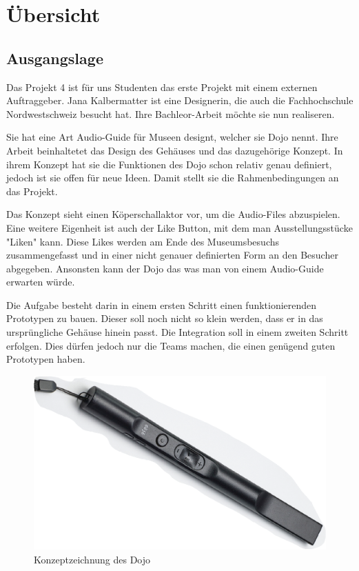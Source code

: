 \section{Übersicht} 

\subsection{Ausgangslage}
Das Projekt 4 ist für uns Studenten das erste Projekt mit einem externen Auftraggeber. Jana Kalbermatter ist eine Designerin, die auch die Fachhochschule Nordwestschweiz besucht hat. Ihre Bachleor-Arbeit möchte sie nun realiseren.

Sie hat eine Art Audio-Guide für Museen designt, welcher sie Dojo nennt. Ihre Arbeit beinhaltetet das Design des Gehäuses und das dazugehörige Konzept. In ihrem Konzept hat sie die Funktionen des Dojo schon relativ genau definiert, jedoch ist sie offen für neue Ideen. Damit stellt sie die Rahmenbedingungen an das Projekt.

Das Konzept sieht einen Köperschallaktor vor, um die Audio-Files abzuspielen. Eine weitere Eigenheit ist auch der Like Button, mit dem man Ausstellungsstücke "Liken" kann. Diese Likes werden am Ende des Museumsbesuchs zusammengefasst und in einer nicht genauer definierten Form an den Besucher abgegeben. Ansonsten kann der Dojo das was man von einem Audio-Guide erwarten würde.

Die Aufgabe besteht darin in einem ersten Schritt einen funktionierenden Prototypen zu bauen. Dieser soll noch nicht so klein werden, dass er in das ursprüngliche Gehäuse hinein passt. Die Integration soll in einem zweiten Schritt erfolgen. Dies dürfen jedoch nur die Teams machen, die einen genügend guten Prototypen haben.

\begin{figure}[H]
\begin{center}
	\includegraphics[width=160mm]{data/Ausgangslage_Dojo.png}
	\caption{Konzeptzeichnung des Dojo} %
	\label{fig:ausgangslage}
\end{center}
\end{figure}


